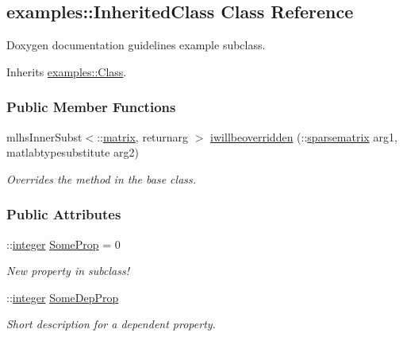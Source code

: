 \hypertarget{classexamples_1_1_inherited_class}{}\subsection{examples\+:\+:Inherited\+Class Class Reference}
\label{classexamples_1_1_inherited_class}


Doxygen documentation guidelines example subclass.  




Inherits \hyperlink{classexamples_1_1_class}{examples\+::\+Class}.

\subsubsection*{Public Member Functions}
\begin{DoxyCompactItemize}
\item 
mlhs\+Inner\+Subst$<$\+::\hyperlink{classmatrix}{matrix}, returnarg $>$ \hyperlink{classexamples_1_1_inherited_class_a959a18d207943f56ec7482137d64876a}{iwillbeoverridden} (\+::\hyperlink{classsparsematrix}{sparsematrix} arg1, matlabtypesubstitute arg2)
\begin{DoxyCompactList}\small\item\em Overrides the method in the base class. \end{DoxyCompactList}\end{DoxyCompactItemize}
\subsubsection*{Public Attributes}
\begin{DoxyCompactItemize}
\item 
\+::\hyperlink{classinteger}{integer} \hyperlink{classexamples_1_1_inherited_class_ab3defe2367efa7a39a89d2cb8c8f5047}{Some\+Prop} = 0
\begin{DoxyCompactList}\small\item\em New property in subclass! \end{DoxyCompactList}\item 
\+::\hyperlink{classinteger}{integer} \hyperlink{classexamples_1_1_inherited_class_a950c8344cf4fa29cc37e77078c023ecd}{Some\+Dep\+Prop}
\begin{DoxyCompactList}\small\item\em Short description for a dependent property. \end{DoxyCompactList}\end{DoxyCompactItemize}

